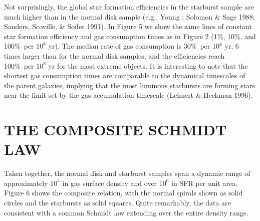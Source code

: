 Not surprisingly, the global star formation efficiencies in the starburst
sample are much higher than in the normal disk sample (e.g., Young ; Solomon \& Sage 1988; Sanders, Scoville, \& Soifer 1991).
In Figure 5 we show the same lines of constant star formation efficiency
and gas consumption times as in Figure 2 (1\%, 10\%, and 100\%\ per $10^8$
yr).  The median rate of gas consumption is 30\%\ per 10$^8$ yr,
6 times larger than for the normal disk samples, and the efficiencies
reach 100\%\ per $10^8$ yr for the most extreme objects.  It is 
interesting to note that the shortest gas consumption times are comparable 
to the dynamical timescales of the parent galaxies, implying that the most
luminous starbursts are forming stars near the limit set by the 
gas accumulation timescale (Lehnert \& Heckman 1996).

\section{THE COMPOSITE SCHMIDT LAW}

Taken together, the normal disk and starburst samples span a dynamic
range of approximately 
$10^5$ in gas surface density and over $10^6$ in SFR per unit 
area.  Figure 6 shows the composite relation, with the normal spirals
shown as solid circles and the starbursts as solid squares.  
Quite remarkably, the data are consistent with a common 
Schmidt law extending over the entire density range.

